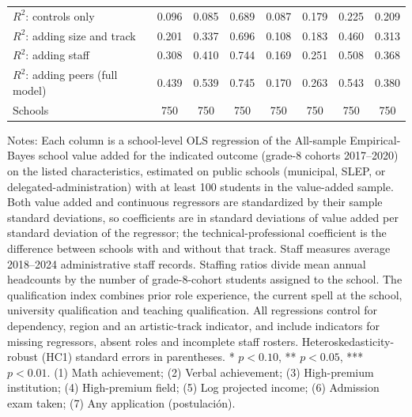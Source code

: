 \begin{table}[!htbp]
{\begin{tabular}{lccccccc}
\midrule
$R^2$: controls only & 0.096 & 0.085 & 0.689 & 0.087 & 0.179 & 0.225 & 0.209 \\
$R^2$: adding size and track & 0.201 & 0.337 & 0.696 & 0.108 & 0.183 & 0.460 & 0.313 \\
$R^2$: adding staff & 0.308 & 0.410 & 0.744 & 0.169 & 0.251 & 0.508 & 0.368 \\
$R^2$: adding peers (full model) & 0.439 & 0.539 & 0.745 & 0.170 & 0.263 & 0.543 & 0.380 \\
Schools & 750 & 750 & 750 & 750 & 750 & 750 & 750 \\
\bottomrule
\end{tabular}}
\par\medskip
\footnotesize
\begin{minipage}{\textwidth}
Notes: Each column is a school-level OLS regression of the All-sample Empirical-Bayes school value added for the indicated outcome (grade-8 cohorts 2017--2020) on the listed characteristics, estimated on public schools (municipal, SLEP, or delegated-administration) with at least 100 students in the value-added sample. Both value added and continuous regressors are standardized by their sample standard deviations, so coefficients are in standard deviations of value added per standard deviation of the regressor; the technical-professional coefficient is the difference between schools with and without that track. Staff measures average 2018--2024 administrative staff records. Staffing ratios divide mean annual headcounts by the number of grade-8-cohort students assigned to the school. The qualification index combines prior role experience, the current spell at the school, university qualification and teaching qualification. All regressions control for dependency, region and an artistic-track indicator, and include indicators for missing regressors, absent roles and incomplete staff rosters. Heteroskedasticity-robust (HC1) standard errors in parentheses. * $p<0.10$, ** $p<0.05$, *** $p<0.01$. (1) Math achievement; (2) Verbal achievement; (3) High-premium institution; (4) High-premium field; (5) Log projected income; (6) Admission exam taken; (7) Any application (postulaci\'on).
\end{minipage}
\end{table}
